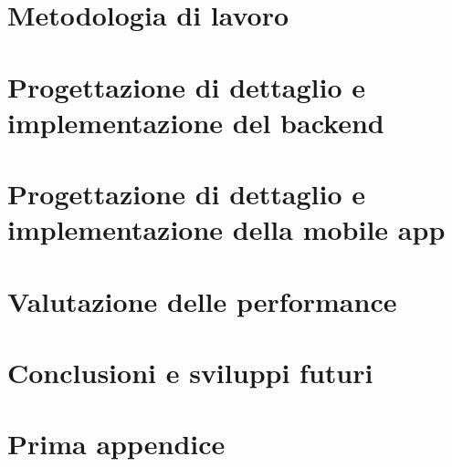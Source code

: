\documentclass[11pt,english,italian,openright]{book}
\begin{document}



\chapter{Metodologia di lavoro\label{ch:metodologia}}




\chapter{Progettazione di dettaglio e implementazione del backend\label{ch:implementazione-backend}}




\chapter{Progettazione di dettaglio e implementazione della mobile app\label{ch:implementazione-app}}




\chapter{Valutazione delle performance\label{ch:performance}}




\chapter{Conclusioni e sviluppi futuri\label{ch:conclusioni}}






\appendix

\chapter{Prima appendice\label{app:prima-appendice}}


\end{document}
